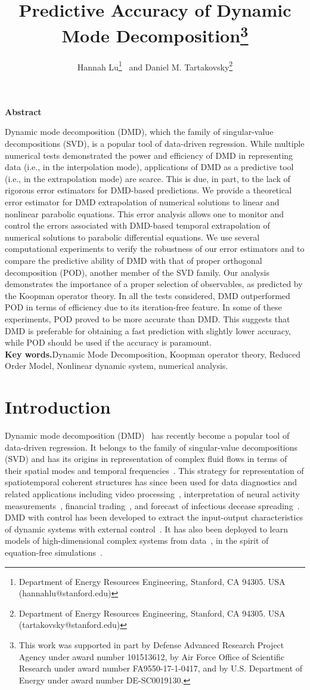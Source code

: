 \documentclass[10pt]{article}
\title {Predictive Accuracy of Dynamic Mode Decomposition\footnote{This work was supported in part by Defense Advanced Research Project Agency under award number 101513612, by Air Force Office of Scientific Research under award number FA9550-17-1-0417, and by U.S. Department of Energy under award number DE-SC0019130.}}
\author{Hannah Lu\footnote{Department of Energy Resources Engineering, Stanford, CA 94305. USA (hannahlu{@}stanford.edu)} \, and Daniel M. Tartakovsky\footnote{Department of Energy Resources Engineering, Stanford, CA 94305. USA (tartakovsky@stanford.edu)} }
\numberwithin{equation}{section}
\theoremstyle{plain}
\theoremstyle{remark}
\theoremstyle{remark}
\begin{document}
\maketitle

\begin{center}
{\bf Abstract}
\end{center}

Dynamic mode decomposition (DMD), which the family of singular-value decompositions (SVD), is a popular tool of data-driven regression. While multiple numerical tests demonstrated the power and efficiency of DMD in representing data (i.e., in the interpolation mode), applications of DMD as a predictive tool (i.e., in the extrapolation mode) are scarce. This is due, in part, to the lack of rigorous error estimators for DMD-based predictions. We provide a theoretical error estimator for DMD extrapolation of numerical solutions to linear and nonlinear parabolic equations. This error analysis allows one to monitor and control the errors associated with DMD-based temporal extrapolation of  numerical solutions to parabolic differential equations.  We use several computational experiments to verify the robustness of our error estimators and to compare the predictive ability of DMD with that of proper orthogonal decomposition (POD), another member of the SVD family. Our analysis demonstrates the importance of a proper selection of observables, as predicted by the Koopman operator theory. In all the tests considered, DMD outperformed POD in terms of efficiency due to its iteration-free feature. In some of these experiments, POD proved to be more accurate than DMD. This suggests that DMD is preferable for obtaining a fast prediction with slightly lower accuracy, while POD should be used if the accuracy is paramount. 
\\

{\bf Key words.}Dynamic Mode Decomposition, Koopman operator theory, Reduced Order Model, Nonlinear dynamic system, numerical analysis.


\section{Introduction}
\label{sec:intro}
Dynamic mode decomposition (DMD)~\cite{kutzbook} has recently become a popular tool of data-driven regression. It belongs to the family of singular-value decompositions (SVD) and has its origins in representation of complex fluid flows in terms of their spatial modes and temporal frequencies~\cite{schmid2010dynamic}. This strategy for representation of spatiotemporal coherent structures has since been used for data diagnostics and related applications including video processing~\cite{kutz2016dynamic}, interpretation of neural activity measurements~\cite{brunton2016extracting}, financial trading~\cite{mann2016dynamic}, and forecast of infectious decease spreading~\cite{proctor2015discovering}. DMD with control has been developed to extract the input-output characteristics of dynamic systems with external control~\cite{proctor2016dynamic}. It has also been deployed to learn models of high-dimensional complex systems from data~\cite{li2017extended,rudy2017data,williams2015data}, in the spirit of equation-free simulations~\cite{kevrekidis2003equation}.
\end{document}
